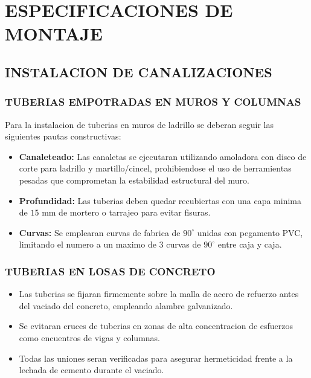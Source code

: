 \chapter*{ESPECIFICACIONES DE MONTAJE}

\setcounter{section}{0}
\renewcommand{\thesection}{4.\arabic{section}.}
\renewcommand{\thesubsection}{4.\arabic{section}.\arabic{subsection}.}
\renewcommand{\thesubsubsection}{4.\arabic{section}.\arabic{subsection}.\arabic{subsubsection}.}
\renewcommand{\theHsection}{montaje.\arabic{section}}
\renewcommand{\theHsubsection}{montaje.\arabic{section}.\arabic{subsection}}
\renewcommand{\theHsubsubsection}{montaje.\arabic{section}.\arabic{subsection}.\arabic{subsubsection}}

\section{INSTALACION DE CANALIZACIONES}

\subsection{TUBERIAS EMPOTRADAS EN MUROS Y COLUMNAS}
Para la instalacion de tuberias en muros de ladrillo se deberan seguir las siguientes pautas constructivas:
\begin{itemize}
  \item \textbf{Canaleteado:} Las canaletas se ejecutaran utilizando amoladora con disco de corte para ladrillo y martillo/cincel, prohibiendose el uso de herramientas pesadas que comprometan la estabilidad estructural del muro.
  \item \textbf{Profundidad:} Las tuberias deben quedar recubiertas con una capa minima de \(15\text{ mm}\) de mortero o tarrajeo para evitar fisuras.
  \item \textbf{Curvas:} Se emplearan curvas de fabrica de \(90^\circ\) unidas con pegamento PVC, limitando el numero a un maximo de 3 curvas de \(90^\circ\) entre caja y caja.
\end{itemize}

\subsection{TUBERIAS EN LOSAS DE CONCRETO}
\begin{itemize}
  \item Las tuberias se fijaran firmemente sobre la malla de acero de refuerzo antes del vaciado del concreto, empleando alambre galvanizado.
  \item Se evitaran cruces de tuberias en zonas de alta concentracion de esfuerzos como encuentros de vigas y columnas.
  \item Todas las uniones seran verificadas para asegurar hermeticidad frente a la lechada de cemento durante el vaciado.
\end{itemize}

